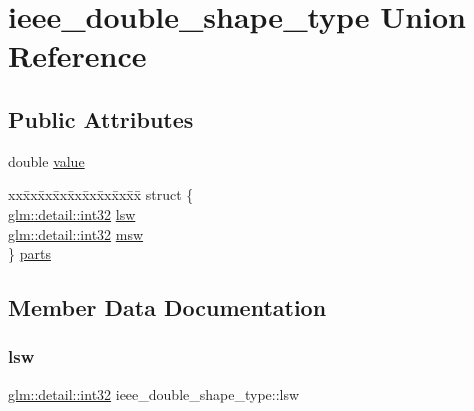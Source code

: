 \hypertarget{unionieee__double__shape__type}{}\section{ieee\+\_\+double\+\_\+shape\+\_\+type Union Reference}
\label{unionieee__double__shape__type}
\subsection*{Public Attributes}
\begin{DoxyCompactItemize}
\item 
double \mbox{\hyperlink{unionieee__double__shape__type_a2d9c4cab9e3fa74e4be6d72f798a145b}{value}}
\item 
\begin{tabbing}
xx\=xx\=xx\=xx\=xx\=xx\=xx\=xx\=xx\=\kill
struct \{\\
\>\mbox{\hyperlink{namespaceglm_1_1detail_a9f85b4efeca416cdcec2fd08939a2e17}{glm::detail::int32}} \mbox{\hyperlink{unionieee__double__shape__type_a15dfdc2d74a323f6638204624834f101}{lsw}}\\
\>\mbox{\hyperlink{namespaceglm_1_1detail_a9f85b4efeca416cdcec2fd08939a2e17}{glm::detail::int32}} \mbox{\hyperlink{unionieee__double__shape__type_aea1156759f6afd58a56a7b4e7bfcee01}{msw}}\\
\} \mbox{\hyperlink{unionieee__double__shape__type_aac525c7c74b266e1e6e4afd83536665d}{parts}}\\

\end{tabbing}\end{DoxyCompactItemize}


\subsection{Member Data Documentation}
\mbox{\label{unionieee__double__shape__type_a15dfdc2d74a323f6638204624834f101}} 
\subsubsection{\texorpdfstring{lsw}{lsw}}
{\footnotesize\ttfamily \mbox{\hyperlink{namespaceglm_1_1detail_a9f85b4efeca416cdcec2fd08939a2e17}{glm\+::detail\+::int32}} ieee\+\_\+double\+\_\+shape\+\_\+type\+::lsw}

